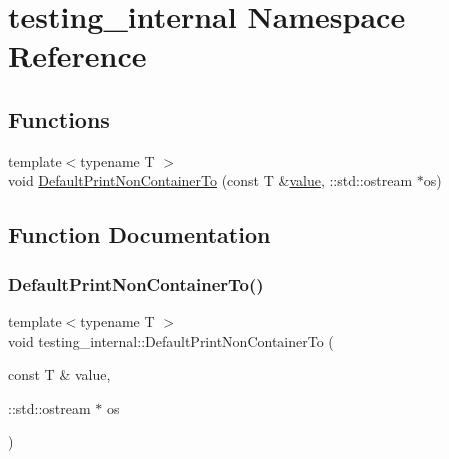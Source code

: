 \hypertarget{namespacetesting__internal}{}\section{testing\+\_\+internal Namespace Reference}
\label{namespacetesting__internal}
\subsection*{Functions}
\begin{DoxyCompactItemize}
\item 
{\footnotesize template$<$typename T $>$ }\\void \mbox{\hyperlink{namespacetesting__internal_a3f49d3d0c996242f9d383c850097a656}{Default\+Print\+Non\+Container\+To}} (const T \&\mbox{\hyperlink{_obj__test_2lib_2googletest-master_2googlemock_2test_2gmock-matchers__test_8cc_a337b8a670efc0b086ad3af163f3121b6}{value}}, \+::std\+::ostream $\ast$os)
\end{DoxyCompactItemize}


\subsection{Function Documentation}
\mbox{\label{namespacetesting__internal_a3f49d3d0c996242f9d383c850097a656}} 
\subsubsection{\texorpdfstring{DefaultPrintNonContainerTo()}{DefaultPrintNonContainerTo()}}
{\footnotesize\ttfamily template$<$typename T $>$ \\
void testing\+\_\+internal\+::\+Default\+Print\+Non\+Container\+To (\begin{DoxyParamCaption}\item[{const T \&}]{value,  }\item[{\+::std\+::ostream $\ast$}]{os }\end{DoxyParamCaption})}

